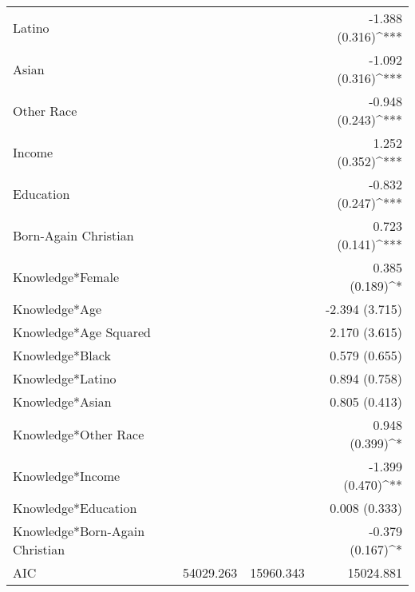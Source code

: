 \begin{tabular}{l D{)}{)}{13)3} D{)}{)}{13)3} D{)}{)}{13)3} }
Latino                             &                        &                         & -1.388 \; (0.316)^{***} \\
Asian                              &                        &                         & -1.092 \; (0.316)^{***} \\
Other Race                         &                        &                         & -0.948 \; (0.243)^{***} \\
Income                             &                        &                         & 1.252 \; (0.352)^{***}  \\
Education                          &                        &                         & -0.832 \; (0.247)^{***} \\
Born-Again Christian               &                        &                         & 0.723 \; (0.141)^{***}  \\
Knowledge*Female                   &                        &                         & 0.385 \; (0.189)^{*}    \\
Knowledge*Age                      &                        &                         & -2.394 \; (3.715)       \\
Knowledge*Age Squared              &                        &                         & 2.170 \; (3.615)        \\
Knowledge*Black                    &                        &                         & 0.579 \; (0.655)        \\
Knowledge*Latino                   &                        &                         & 0.894 \; (0.758)        \\
Knowledge*Asian                    &                        &                         & 0.805 \; (0.413)        \\
Knowledge*Other Race               &                        &                         & 0.948 \; (0.399)^{*}    \\
Knowledge*Income                   &                        &                         & -1.399 \; (0.470)^{**}  \\
Knowledge*Education                &                        &                         & 0.008 \; (0.333)        \\
Knowledge*Born-Again Christian     &                        &                         & -0.379 \; (0.167)^{*}   \\
\midrule
AIC                                & 54029.263              & 15960.343               & 15024.881               \\

\end{tabular}
